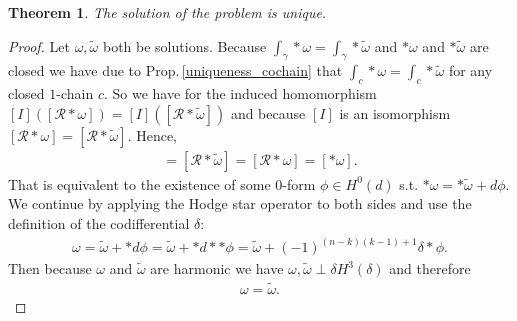 \documentclass[12pt,a4paper]{article}
\newtheorem{theorem}{Theorem}
\theoremstyle{definition}
\newcommand{\real}{\mathbb{R}}
\newcommand{\rop}{\mathscr{R}} %
\begin{document}
\begin{theorem}
    The solution of the problem is unique.
\end{theorem}
\begin{proof}
    Let $\omega, \tilde{\omega}$ both be solutions. 
    Because $\int_\gamma *\omega = \int_\gamma *\tilde{\omega}$ and $*\omega$ and
    $*\tilde{\omega}$ are closed we have due to Prop.\,\ref{uniqueness_cochain} %
    that $\int_c *\omega = \int_c *\tilde{\omega}$ for any closed $1$-chain $c$.
    So we have for the induced homomorphism $[I]([\rop *\omega]) = 
    [I]([\rop *\tilde{\omega}])$ and because $[I]$ is an isomorphism 
    $[\rop *\omega] = [\rop *\tilde{\omega}]$. Hence,
    \begin{align*}
    [*\tilde{\omega}] = [\rop *\tilde{\omega}] = 
    [\rop *\omega] = [*\omega].
    \end{align*}
    That is equivalent to the
    existence of some $0$-form $\phi \in H^0(d)$ s.t.
    $*\omega = *\tilde{\omega} + d\phi$. We continue by applying the Hodge
    star operator to both sides and use the definition of the codifferential 
    $\delta$:
    \begin{align*}
        \omega = \tilde{\omega} + *d\phi = \tilde{\omega} + *d**\phi 
        = \tilde{\omega} + (-1)^{(n-k)(k-1)+1}\delta * \phi.
    \end{align*}
    Then because $\omega$ and 
    $\tilde{\omega}$ are harmonic we have 
    $\omega, \tilde{\omega} \perp \delta H^{3}(\delta)$ and therefore 
    \begin{align*}
    \omega = \tilde{\omega}.    
    \end{align*}
\end{proof}


\end{document}
